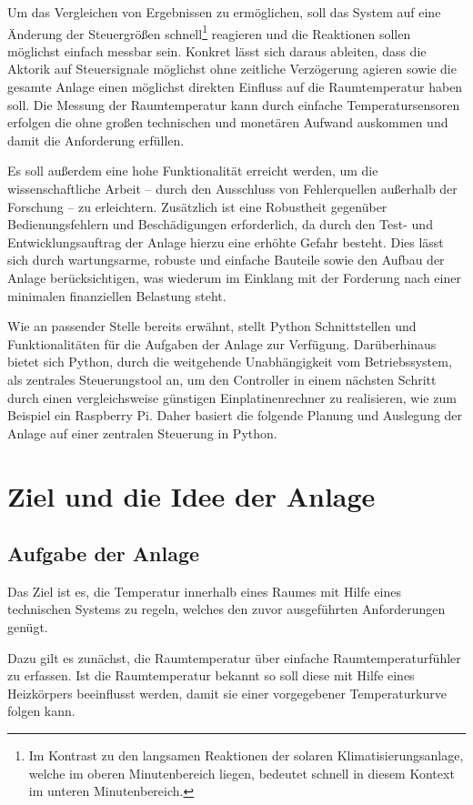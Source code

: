 Um das Vergleichen von Ergebnissen zu ermöglichen, soll das System auf eine Änderung der Steuergrößen schnell\footnote{Im Kontrast zu den langsamen Reaktionen der solaren Klimatisierungsanlage, welche im oberen Minutenbereich liegen, bedeutet schnell in diesem Kontext im unteren Minutenbereich.} reagieren und die Reaktionen sollen möglichst einfach messbar sein. 
Konkret lässt sich daraus ableiten, dass die Aktorik auf Steuersignale möglichst ohne zeitliche Verzögerung agieren sowie die gesamte Anlage einen möglichst direkten Einfluss auf die Raumtemperatur haben soll. 
Die Messung der Raumtemperatur kann durch einfache Temperatursensoren erfolgen die ohne großen technischen und monetären Aufwand auskommen und damit die Anforderung erfüllen.

Es soll außerdem eine hohe Funktionalität erreicht werden, um die wissenschaftliche Arbeit -- durch den Ausschluss von Fehlerquellen außerhalb der Forschung -- zu erleichtern. 
Zusätzlich ist eine Robustheit gegenüber Bedienungsfehlern und Beschädigungen erforderlich, da durch den Test- und Entwicklungsauftrag der Anlage hierzu eine erhöhte Gefahr besteht. Dies lässt sich durch wartungsarme, robuste und einfache Bauteile sowie den Aufbau der Anlage berücksichtigen, was wiederum im Einklang mit der Forderung nach einer minimalen finanziellen Belastung steht.

Wie an passender Stelle bereits erwähnt, stellt Python Schnittstellen und Funktionalitäten für die Aufgaben der Anlage zur Verfügung. Darüberhinaus bietet sich Python, durch die weitgehende Unabhängigkeit vom Betriebssystem, als zentrales Steuerungstool an, um den Controller in einem nächsten Schritt durch einen vergleichsweise günstigen Einplatinenrechner zu realisieren, wie zum Beispiel ein Raspberry Pi. Daher basiert die folgende Planung und Auslegung der Anlage auf einer zentralen Steuerung in Python.

\section{Ziel und die Idee der Anlage}


\subsection{Aufgabe der Anlage}
Das Ziel ist es, die Temperatur innerhalb eines Raumes mit Hilfe eines technischen Systems zu regeln, welches den zuvor ausgeführten Anforderungen genügt.

Dazu gilt es zunächst, die Raumtemperatur über einfache Raumtemperaturfühler zu erfassen. Ist die Raumtemperatur bekannt so soll diese mit Hilfe eines Heizkörpers beeinflusst werden, damit sie einer vorgegebener Temperaturkurve folgen kann. 

